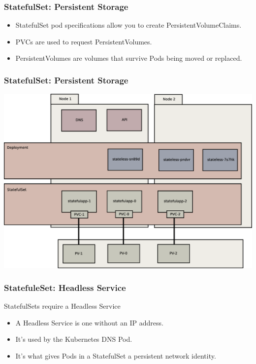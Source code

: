 \documentclass{beamer}
\begin{document}
\begin{frame}
    \frametitle{StatefulSet: Persistent Storage}
    \begin{itemize}
        \item StatefulSet pod specifications allow you to create PersistentVolumeClaims.
        \item PVCs are used to request PersistentVolumes.
        \item PersistentVolumes are volumes that survive Pods being moved or replaced.
    \end{itemize}
\end{frame}

\begin{frame}
    \frametitle{StatefulSet: Persistent Storage}
    \includegraphics[width=\textwidth,height=0.85\textheight,keepaspectratio]{graphics/06-persistence.eps}
\end{frame}

\begin{frame}
    \frametitle{StatefuleSet: Headless Service}
    StatefulSets require a Headless Service
    \begin{itemize}
        \item A Headless Service is one without an IP address.
        \item It's used by the Kubernetes DNS Pod.
        \item It's what gives Pods in a StatefulSet a persistent network identity.
    \end{itemize}
\end{frame}
\end{document}
